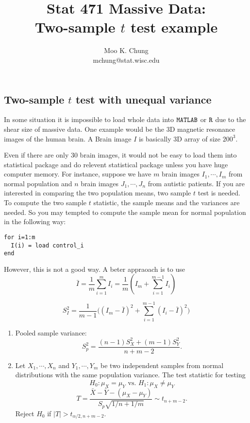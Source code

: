 \documentclass[11pt,twocolumn]{article} %
\begin{document}

\title{Stat 471 Massive Data:\\
Two-sample $t$ test example}

\author{Moo K. Chung\\
mchung@stat.wisc.edu}
\maketitle \thispagestyle{empty} 

\subsection*{Two-sample $t$ test with unequal variance}
In some situation it is impossible to load whole data
into $\tt{MATLAB}$ or $\tt{R}$ due to the shear size of massive data.
One example would be the 3D magnetic resonance images of the human brain.
A Brain image $I$ is basically 3D array of size $200^3$. 

Even if there are
only 30 brain images, it would not be easy to load them into statistical package and do relevent statistical package unless you have huge computer memory. For instance, suppose we have $m$ brain images $I_1,\cdots,I_m$ from normal population and $n$ brain images $J_1,\cdots,J_n$ from autistic patients. If you are interested in comparing the two population means, two sample $t$ test is needed. To compute the two sample $t$ statistic, the sample means and the variances are needed. So you may tempted to compute the sample mean for normal population in the following way:
\begin{verbatim}
for i=1:m
  I(i) = load control_i
end

\end{verbatim}

However, this is not a good way. A beter appraoach is to use
$$\bar I= \frac{1}{m}\sum_{i=1}^m I_i = \frac{1}{m} (I_m + \sum_{i=1}^{m-1} I_i)$$

$$S_I^2=  \frac{1}{m-1}\Big((I_m -\bar I)^2 + \sum_{i=1}^{m-1} (I_i-\bar I)^2\Big)$$

\begin{enumerate}
\item Pooled sample variance:
$$S_p^2 = \frac{(n-1)S_X^2 + (m-1)S_Y^2}{n+m-2}.$$

\item Let $X_1,\cdots,X_n$ and $Y_1,\cdots,Y_m$ be two independent
samples from normal distributions with the same population
variance. The test statistic for testing
$$H_0: \mu_X = \mu_Y \mbox{ vs. } H_1: \mu_X \neq \mu_Y$$
$$T=\frac{\bar X - \bar Y -(\mu_X -\mu_Y)}{S_p\sqrt{1/n + 1/m}} \sim t_{n+m-2}.$$
Reject $H_0$ if $|T| > t_{\alpha/2,n+m-2}$.

\end{enumerate}
\end{document}

